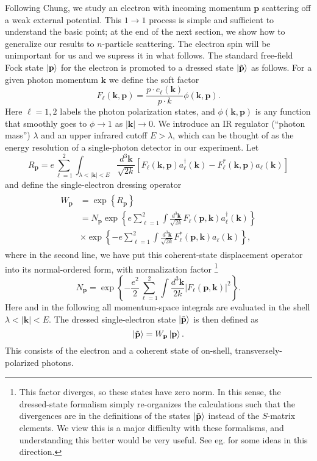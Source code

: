 \documentclass[twocolumn,prd]{revtex4}
\newcommand{\be}{\begin{equation}}
\newcommand{\ee}{\end{equation}}
\newcommand{\mb}{\mathbf}
\begin{document}
Following Chung, we study an electron with incoming momentum $\mb{p}$ scattering off a weak external potential. This $1 \to 1$ process is simple and sufficient to understand the basic point; at the end of the next section, we show how to generalize our results to $n$-particle scattering. The electron spin will be unimportant for us and we supress it in what follows. The standard free-field Fock state $\ket{\mb{p}}$ for the electron is promoted to a dressed state $\ket{\tilde{\mb{p}}}$ as follows. For a given photon momentum $\mb{k}$ we define the soft factor
\be
\label{softfactor}
F_{\ell}(\mb{k},\mb{p}) = \frac{p \cdot e_{\ell}(\mb{k})}{p \cdot k} \phi(\mb{k},\mb{p}).
\ee
Here $\ell = 1,2$ labels the photon polarization states, and $\phi(\mb{k},\mb{p})$ is any function that smoothly goes to $\phi \to 1$ as $|\mb{k}| \to 0$. We introduce an IR regulator (``photon mass'') $\lambda$ and an upper infrared cutoff $E > \lambda$, which can be thought of as the energy resolution of a single-photon detector in our experiment. Let
\be
R_{\mb{p}} = e \sum_{\ell=1}^{2} \int_{\lambda < |\mb{k}| < E} \frac{d^3 \mb{k}}{\sqrt{2k}} \left[ F_{\ell}(\mb{k},\mb{p}) a_{\ell}^{\dagger}(\mb{k}) - F_{\ell}^{*}(\mb{k},\mb{p}) a_{\ell}(\mb{k}) \right] 
\ee
and define the single-electron dressing operator
\begin{align}
\begin{split}
\label{dressingop}
W_{\mb{p}} & = \exp \left\{ R_{\mb{p}} \right\} \\
& = N_{\mb{p}} \exp \left\{ e \sum_{\ell = 1}^{2} \int \frac{d^3\mb{k}}{\sqrt{2k}} F_{\ell}(\mb{p},\mb{k}) a_{\ell}^{\dagger}(\mb{k}) \right\} \\
& \times \exp \left\{ -e \sum_{\ell = 1}^{2} \int \frac{d^3\mb{k}}{\sqrt{2k}} F^*_{\ell}(\mb{p},\mb{k}) a_{\ell}(\mb{k}) \right\},
\end{split}
\end{align}
where in the second line, we have put this coherent-state displacement operator into its normal-ordered form, with normalization factor \footnote{This factor diverges, so these states have zero norm. In this sense, the dressed-state formalism simply re-organizes the calculations such that the divergences are in the definitions of the states $\ket{\tilde{\mb{p}}}$ instead of the $S$-matrix elements. We view this is a major difficulty with these formalisms, and understanding this better would be very useful. See eg. \cite{Dybalski:2017mip} for some ideas in this direction.}
\be
N_{\mb{p}} = \exp \left\{ -\frac{e^2}{2} \sum_{\ell = 1}^{2} \int \frac{d^3\mb{k}}{2k} \left| F_{\ell}(\mb{p},\mb{k}) \right|^2 \right\}.
\ee
Here and in the following all momentum-space integrals are evaluated in the shell $\lambda < |\mb{k}| < E$. The dressed single-electron state $\ket{\tilde{\mb{p}}}$ is then defined as
\be
\ket{\tilde{\mb{p}}} = W_{\mb{p}} \ket{\mb{p}}.
\ee
This consists of the electron and a coherent state of on-shell, transversely-polarized photons. 
\end{document}
